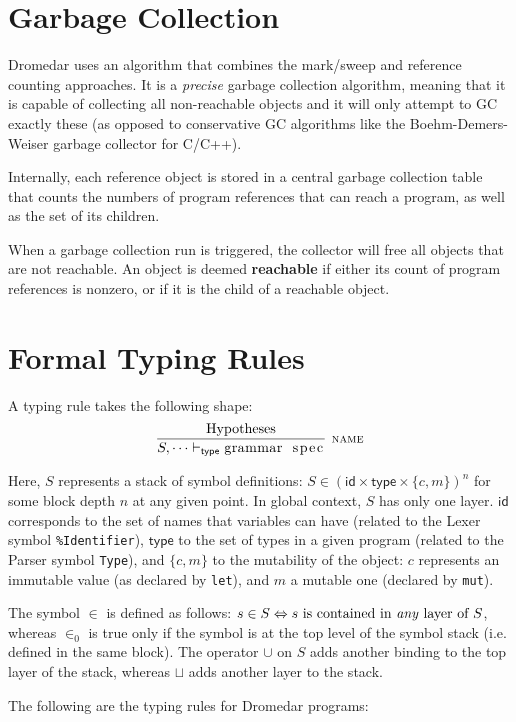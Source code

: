 \documentclass{article}
\newcommand{\code}[1]{\lstinline[columns=fixed]{#1}}
\newcommand{\drmrule}[5]{\frac{#1}{#2\vdash_{\mathsf{#3}}#4}\textsc{\ \small{#5}}}
\newcommand{\mc}[1]{\textnormal{\code{#1}}}
\begin{document}
	\section{Garbage Collection}
	
		Dromedar uses an algorithm that combines the mark/sweep and reference counting approaches. It is a \textit{precise} garbage collection algorithm, meaning that it is capable of collecting all non-reachable objects and it will only attempt to GC exactly these (as opposed to conservative GC algorithms like the Boehm-Demers-Weiser garbage collector for C/C++).
		
		Internally, each reference object is stored in a central garbage collection table that counts the numbers of program references that can reach a program, as well as the set of its children.
		
		When a garbage collection run is triggered, the collector will free all objects that are not reachable. An object is deemed \textbf{reachable} if either its count of program references is nonzero, or if it is the child of a reachable object.
		
	\section{Formal Typing Rules}
	
		A typing rule takes the following shape: $$ \drmrule{\mathrm{Hypotheses}}{S,\dots}{type}{\mc{grammar spec}}{name} $$
		
		Here, $S$ represents a stack of symbol definitions: $S \in (\mathsf{id} \times \mathsf{type} \times \{c,m\})^n$ for some block depth $n$ at any given point. In global context, $S$ has only one layer. $\mathsf{id}$ corresponds to the set of names that variables can have (related to the Lexer symbol \texttt{\%Identifier}), $\mathsf{type}$ to the set of types in a given program (related to the Parser symbol \texttt{Type}), and $\{c,m\}$ to the mutability of the object: $c$ represents an immutable value (as declared by \code{let}), and $m$ a mutable one (declared by \code{mut}).
		
		The symbol $\in$ is defined as follows: $s\in S \Leftrightarrow \textnormal{$s$ is contained in \textit{any} layer of $S$}$, whereas $\in_0$ is true only if the symbol is at the top level of the symbol stack (i.e. defined in the same block). The operator $\cup$ on $S$ adds another binding to the top layer of the stack, whereas $\sqcup$ adds another layer to the stack.
		
		The following are the typing rules for Dromedar programs:
		
\end{document}
